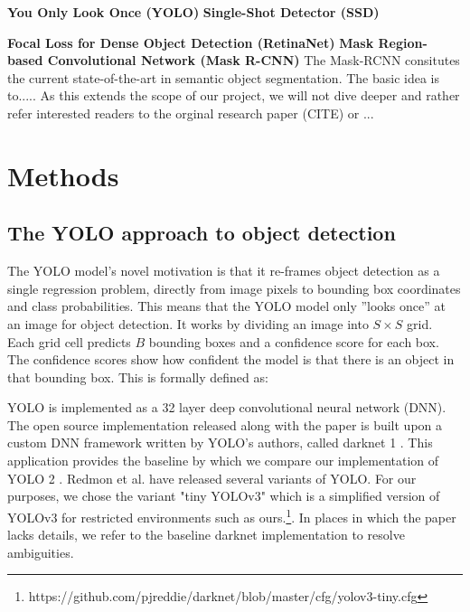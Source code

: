 \documentclass[a4paper]{article}
\begin{document}
\textbf{You Only Look Once (YOLO)}
\textbf{Single-Shot Detector (SSD)}

\textbf{Focal Loss for Dense Object Detection (RetinaNet)}
\textbf{Mask Region-based Convolutional Network (Mask R-CNN)}
The Mask-RCNN consitutes the current state-of-the-art in semantic object segmentation. The basic idea is to.....
As this extends the scope of our project, we will not dive deeper and rather refer interested readers to the orginal research paper (CITE) or ...
\section{Methods}
\subsection*{The YOLO approach to object detection}
The YOLO model’s novel motivation is that it re-frames
object detection as a single regression problem, directly
from image pixels to bounding box coordinates and class
probabilities. This means that the YOLO model only ”looks
once” at an image for object detection.
It works by dividing an image into $S\times S$ grid. Each grid
cell predicts $B$ bounding boxes and a confidence score for
each box. The confidence scores show how confident the
model is that there is an object in that bounding box. This
is formally defined as:

YOLO is implemented as a 32 layer deep convolutional
neural network (DNN). The open source implementation released
along with the paper is built upon a custom DNN
framework written by YOLO’s authors, called darknet 1
.
This application provides the baseline by which we compare
our implementation of YOLO 2
. Redmon et al. have
released several variants of YOLO. For our purposes, we
chose the variant "tiny YOLOv3" which is a simplified version of YOLOv3 for restricted environments such as ours.\footnote{https://github.com/pjreddie/darknet/blob/master/cfg/yolov3-tiny.cfg}. In places in which the paper lacks details, we refer to the baseline darknet implementation
to resolve ambiguities.
\end{document}
